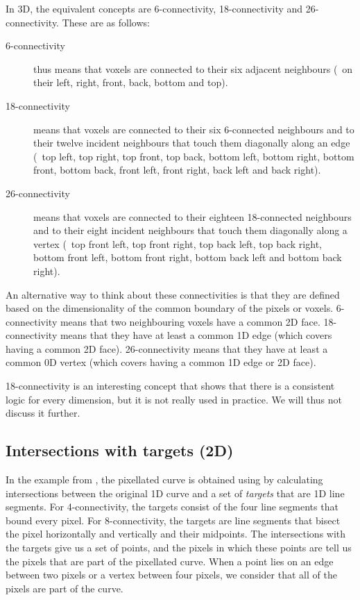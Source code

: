In 3D, the equivalent concepts are 6-connectivity, 18-connectivity and 26-connectivity.
These are as follows:
\begin{description}
\item[6-connectivity] thus means that voxels are connected to their six adjacent neighbours (\ie\ on their left, right, front, back, bottom and top).
\item[18-connectivity] means that voxels are connected to their six 6-connected neighbours and to their twelve incident neighbours that touch them diagonally along an edge (\ie\ top left, top right, top front, top back, bottom left, bottom right, bottom front, bottom back, front left, front right, back left and back right).
\item[26-connectivity] means that voxels are connected to their eighteen 18-connected neighbours and to their eight incident neighbours that touch them diagonally along a vertex (\ie\ top front left, top front right, top back left, top back right, bottom front left, bottom front right, bottom back left and bottom back right).
\end{description}

An alternative way to think about these connectivities is that they are defined based on the dimensionality of the common boundary of the pixels or voxels.
6-connectivity means that two neighbouring voxels have a common 2D face.
18-connectivity means that they have at least a common 1D edge (which covers having a common 2D face).
26-connectivity means that they have at least a common 0D vertex (which covers having a common 1D edge or 2D face).

18-connectivity is an interesting concept that shows that there is a consistent logic for every dimension, but it is not really used in practice.
We will thus not discuss it further.

\subsection{Intersections with targets (2D)}

In the example from , the pixellated curve is obtained using by calculating intersections between the original 1D curve and a set of \emph{targets} that are 1D line segments.
For 4-connectivity, the targets consist of the four line segments that bound every pixel.
For 8-connectivity, the targets are line segments that bisect the pixel horizontally and vertically and their midpoints.
The intersections with the targets give us a set of points, and the pixels in which these points are tell us the pixels that are part of the pixellated curve.
When a point lies on an edge between two pixels or a vertex between four pixels, we consider that all of the pixels are part of the curve.

